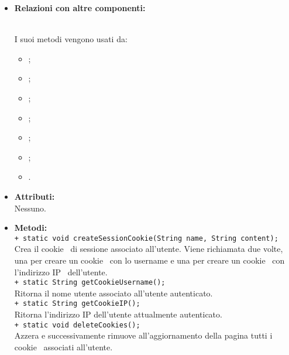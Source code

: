 {\begin{sloppypar}
{{{{\begin{itemize}
					\item[] \textbf{Relazioni con altre componenti:}{\\
					I suoi metodi vengono usati da:
					\begin{itemize}
					\item[] ;
					\item[] ;
					\item[] ;
					\item[] ;
					\item[] ;
					\item[] ;
					\item[] .\\
				\end{itemize}
		
					}
					
				\item[] \textbf{Attributi:}{\\
					Nessuno.\\
					}
				
				\item[] \textbf{Metodi:}{ \\
					\texttt{+ static void createSessionCookie(String name, String content);}\\
					Crea il cookie\g~ di sessione associato all'utente. Viene richiamata due volte, una per creare un cookie\g~ con lo username e una per creare un cookie\g~ con l'indirizzo IP\g~ dell'utente.\\

					\texttt{+ static String getCookieUsername();}\\
					Ritorna il nome utente associato all'utente autenticato.\\
					
					\texttt{+ static String getCookieIP();}\\
					Ritorna l'indirizzo IP dell'utente attualmente autenticato.\\

					\texttt{+ static void deleteCookies();}\\
					Azzera e successivamente rimuove all'aggiornamento della pagina tutti i cookie\g~ associati all'utente.\\
				}
			\end{itemize}
			}
		}
	
}}
\end{sloppypar}}
